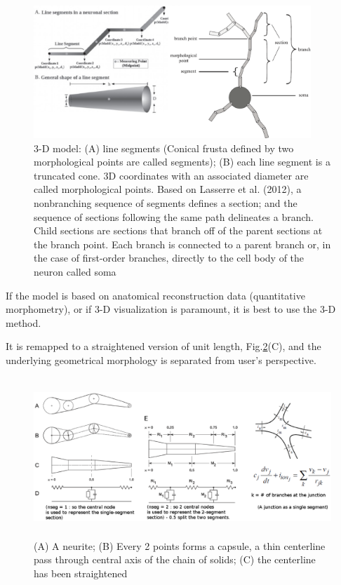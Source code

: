 \begin{figure}[hbt]
  \centerline{\includegraphics[height=5cm,
    angle=0]{./images/NEURON-3dpt-line-segment.eps}}
 \caption{3-D model: (A) line segments (Conical frusta
defined by two morphological points are called segments); (B) each line segment
is a truncated
 cone. 3D coordinates with an associated diameter are called morphological
 points. Based on Lasserre et al. (2012), a nonbranching sequence of segments
 defines a section; and the sequence of sections following the same path
 delineates a branch. Child sections are
sections that branch off of the parent sections at the branch point. Each branch
is connected to a parent branch or, in the case of first-order branches,
directly to the cell body of the neuron called soma
\citep{lasserre2012}}
\label{fig:NEURON-3dpt-line-segment}
\end{figure}


\begin{mdframed}
If the model is based on anatomical reconstruction data (quantitative
morphometry), or if 3-D visualization is paramount, it is best to use the 3-D
method.

\end{mdframed}

It is remapped to a straightened version of unit length,
Fig.\ref{fig:NEURON_section-segments}(C), and the underlying geometrical
morphology is separated from user's perspective.

\begin{figure}[hbt]
 \centerline{\includegraphics[height=6cm]{./images/NEURON_section-segments.eps}}
 \caption{(A) A neurite; (B) Every 2 points forms a capsule, a thin centerline
 pass through central axis of the chain of solids; (C) the centerline has been
 straightened }
\label{fig:NEURON_section-segments}
\end{figure}
 
